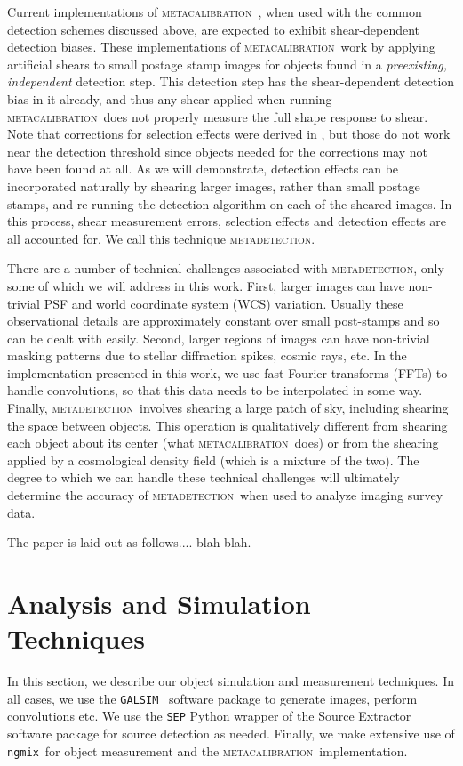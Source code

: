 \documentclass[fleqn,useAMS,usenatbib]{mnras}
\newcommand{\galsim}{\texttt{GALSIM}}
\newcommand{\ngmix}{\texttt{ngmix}}
\newcommand{\mcal}{\textsc{metacalibration}}
\newcommand{\mdet}{\textsc{metadetection}}
\begin{document}
Current implementations of \mcal\ \citep[e.g.,][]{HuffMcal2017,SheldonMcal2017},
when used with the common detection schemes discussed above, are expected to exhibit shear-dependent
detection biases. These implementations of \mcal\ work by applying artificial
shears to small postage stamp images for objects found in a {\em preexisting, independent}
detection step. This detection step has the shear-dependent detection bias in it already,
and thus any shear applied when running \mcal\ does not properly measure the full shape response
to shear. Note that corrections for selection effects were derived in
\cite{SheldonMcal2017}, but those do not work near the detection threshold since objects
needed for the corrections may not have been found at all. As we will
demonstrate, detection effects can be incorporated naturally by shearing larger
images, rather than small postage stamps, and re-running the detection algorithm on
each of the sheared images. In this process, shear measurement errors,
selection effects and detection effects are all accounted for. We call this technique
\mdet.

There are a number of technical challenges associated with \mdet, only some of which
we will address in this work. First, larger images can have non-trivial
PSF and world coordinate system (WCS) variation. Usually these observational details
are approximately constant over small post-stamps and so can be dealt with easily.
Second, larger regions of images can have non-trivial masking patterns due to
stellar diffraction spikes, cosmic rays, etc. In the implementation presented in
this work, we use fast Fourier transforms (FFTs) to handle convolutions, so that
this data needs to be interpolated in some way. Finally, \mdet\ involves shearing
a large patch of sky, including shearing the space between objects. This operation
is qualitatively different from shearing each object about its center (what \mcal\ does)
or from the shearing applied by a cosmological density field (which is a mixture of
the two). The degree to which we can handle these technical challenges will ultimately
determine the accuracy of \mdet\ when used to analyze imaging survey data.


The paper is laid out as follows.... blah blah.

\section{Analysis and Simulation Techniques}
\label{sec:sims}

In this section, we describe our object simulation and measurement techniques. In
all cases, we use the \galsim\ \citep{GALSIM2015} software package
to generate images, perform convolutions etc. We use the \texttt{SEP} \citep{sep}
Python wrapper of the Source Extractor software package \citep{Bertin96} for
source detection as needed. Finally, we make extensive use of \ngmix\
for object measurement and the \mcal\ implementation.
\end{document}
